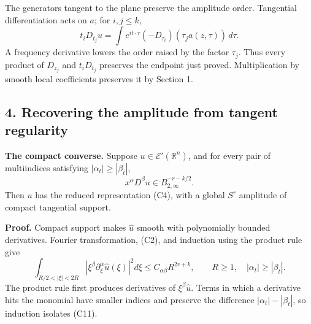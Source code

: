 \documentclass[
  11pt,
]{article}
\makeatletter
\let\ReaderOriginalAnchorStart\hyper@anchorstart
\let\ReaderOriginalAnchorEnd\hyper@anchorend
\let\ReaderPendingAliases\@empty
\def\ReaderArmAliases#1{\gdef\ReaderPendingAliases{#1}}
\def\hyper@anchorstart#1{\ReaderIfNativeAnchorTF{#1}{\ReaderPendingAliases\global\let\ReaderPendingAliases\@empty}{}\ReaderOriginalAnchorStart{#1}}
\makeatother
\begin{document}
The generators tangent to the plane preserve the amplitude order.
Tangential differentiation acts on \(a\); for \(i,j\leq k\), \[
t_iD_{t_j}u
=\int e^{it\cdot\tau}(-D_{\tau_i})(\tau_j a(z,\tau))\,d\tau.
\tag{C9}
\] A frequency derivative lowers the order raised by the factor
\(\tau_j\). Thus every product of \(D_{z_j}\) and \(t_iD_{t_j}\)
preserves the endpoint just proved. Multiplication by smooth local
coefficients preserves it by Section 1.

\ReaderArmAliases{\ReaderOriginalAnchorStart{AN03-CN-004}\ReaderOriginalAnchorEnd\begingroup\expandafter\def\csname @currentHref\endcsname{AN03-CN-004}\label{AN03-CN-004}\endgroup\ReaderOriginalAnchorStart{an03-cn-004-recovering-the-amplitude-from-tangent-regularity}\ReaderOriginalAnchorEnd\begingroup\expandafter\def\csname @currentHref\endcsname{an03-cn-004-recovering-the-amplitude-from-tangent-regularity}\label{an03-cn-004-recovering-the-amplitude-from-tangent-regularity}\endgroup\ReaderOriginalAnchorStart{4-recovering-the-amplitude-from-tangent-regularity}\ReaderOriginalAnchorEnd\begingroup\expandafter\def\csname @currentHref\endcsname{4-recovering-the-amplitude-from-tangent-regularity}\label{4-recovering-the-amplitude-from-tangent-regularity}\endgroup\ReaderOriginalAnchorStart{recovering-the-amplitude-from-tangent-regularity}\ReaderOriginalAnchorEnd}
\subsection{4. Recovering the amplitude from tangent
regularity}\label{recovering-the-amplitude-from-tangent-regularity}

\textbf{The compact converse.} Suppose \(u\in\mathcal E'(\mathbb R^n)\),
and for every pair of multiindices satisfying
\(|\alpha_t|\geq|\beta_t|\), \[
x^\alpha D^\beta u\in B^{-r-k/2}_{2,\infty}.
\tag{C10}
\] Then \(u\) has the reduced representation (C4), with a global \(S^r\)
amplitude of compact tangential support.

\textbf{Proof.} Compact support makes \(\widehat u\) smooth with
polynomially bounded derivatives. Fourier transformation, (C2), and
induction using the product rule give \[
\int_{R/2<|\xi|<2R}
|\xi^\beta\partial_\xi^\alpha\widehat u(\xi)|^2d\xi
\leq C_{\alpha\beta}R^{2r+k},\qquad R\geq1,
\quad |\alpha_t|\geq|\beta_t|.
\tag{C11}
\] The product rule first produces derivatives of
\(\xi^\beta\widehat u\). Terms in which a derivative hits the monomial
have smaller indices and preserve the difference
\(|\alpha_t|-|\beta_t|\), so induction isolates (C11).
\end{document}
